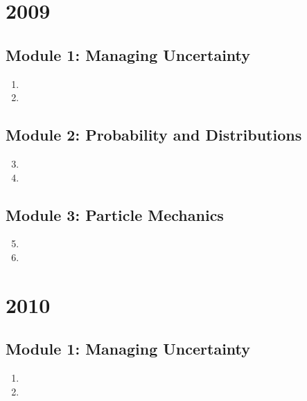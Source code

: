\documentclass{solutionsmannual}
\begin{document}
\chapter{2009}
\section{Module 1: Managing Uncertainty}
\begin{enumerate}[label=\bfseries  \arabic*.]\setcounter{enumi}{0}
\item 
\item 
\end{enumerate}
\section{Module 2: Probability and Distributions}
\begin{enumerate}[label=\bfseries  \arabic*.]\setcounter{enumi}{2}
\item 
\item 
\end{enumerate}
\section{Module 3: Particle Mechanics}
\begin{enumerate}[label=\bfseries  \arabic*.]\setcounter{enumi}{4}
\item 
\item 
\end{enumerate}

\chapter{2010}
\section{Module 1: Managing Uncertainty}
\begin{enumerate}[label=\bfseries  \arabic*.]\setcounter{enumi}{0}
\item 
\item 
\end{enumerate}
\end{document}
